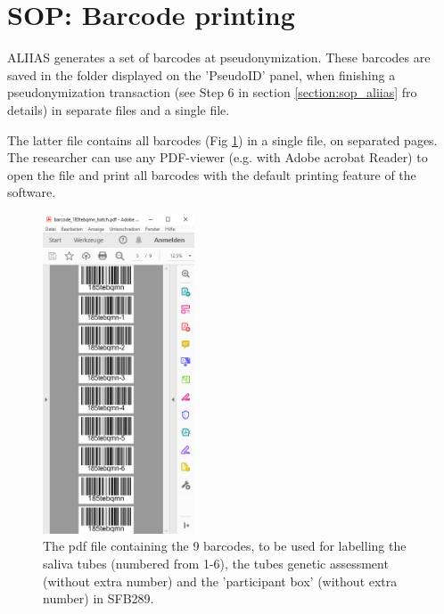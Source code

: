 \pagebreak

\section{SOP: Barcode printing}
\label{section:sop_barcode}

ALIIAS generates a set of barcodes at pseudonymization. These barcodes are saved in the folder displayed on the 'PseudoID' panel, when finishing a pseudonymization transaction (see Step 6 in section \ref{section:sop_aliias} fro details) in separate  files and a single  file.

The latter file contains all barcodes (Fig \ref{fig:barcodes}) in a single file, on separated pages. The researcher can use any PDF-viewer (e.g. with Adobe acrobat Reader) to open the file and print all barcodes with the default printing feature of the software.

\begin{figure}[H]
\centering
\includegraphics[width=0.4\textwidth]{docs/fig/09_barcodes.PNG}
\caption{The pdf file containing the 9 barcodes, to be used for labelling the saliva tubes (numbered from 1-6), the tubes genetic assessment (without extra number) and the 'participant box' (without extra number) in SFB289.}
\label{fig:barcodes}
\end{figure}